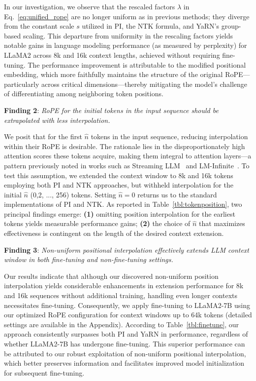 In our investigation, we observe that the rescaled factors $\lambda$ in Eq.~\ref{eq:unified_rope} are no longer uniform as in previous methods; they diverge from the constant scale $s$ utilized in PI, the NTK formula, and YaRN's group-based scaling. This departure from uniformity in the rescaling factors yields notable gains in language modeling performance (as measured by perplexity) for LLaMA2 across 8k and 16k context lengths, achieved without requiring fine-tuning. The performance improvement is attributable to the modified positional embedding, which more faithfully maintains the structure of the original RoPE—particularly across critical dimensions—thereby mitigating the model's challenge of differentiating among neighboring token positions.

\textbf{Finding 2}: \textit{RoPE for the initial tokens in the input sequence should be extrapolated with less interpolation.} 

We posit that for the first $\hat{n}$ tokens in the input sequence, reducing interpolation within their RoPE is desirable. The rationale lies in the disproportionately high attention scores these tokens acquire, making them integral to attention layers—a pattern previously noted in works such as Streaming LLM~\cite{streamingllm} and LM-Infinite~\cite{han2023lminfinite}. To test this assumption, we extended the context window to 8k and 16k tokens employing both PI and NTK approaches, but withheld interpolation for the initial $\hat n$ (0,2, ..., 256) tokens. Setting $\hat n=0$ returns us to the standard implementations of PI and NTK. As reported in Table~\ref{tbl:tokenposition}, two principal findings emerge: \textbf{(1)} omitting position interpolation for the earliest tokens yields measurable performance gains; \textbf{(2)} the choice of $\hat n$ that maximizes effectiveness is contingent on the length of the desired context extension.

\textbf{Finding 3}: \textit{Non-uniform positional interpolation effectively extends LLM context window in both fine-tuning and non-fine-tuning settings.} 

Our results indicate that although our discovered non-uniform position interpolation yields considerable enhancements in extension performance for 8k and 16k sequences without additional training, handling even longer contexts necessitates fine-tuning. Consequently, we apply fine-tuning to LLaMA2-7B using our optimized RoPE configuration for context windows up to 64k tokens (detailed settings are available in the Appendix). According to Table~\ref{tbl:finetune}, our approach consistently surpasses both PI and YaRN in performance, regardless of whether LLaMA2-7B has undergone fine-tuning. This superior performance can be attributed to our robust exploitation of non-uniform positional interpolation, which better preserves information and facilitates improved model initialization for subsequent fine-tuning.

